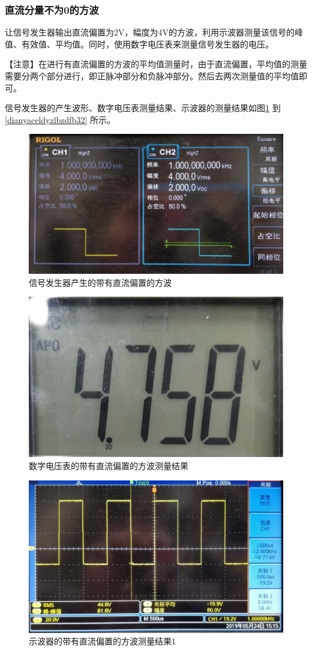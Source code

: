 \documentclass[12pt]{article}
\begin{document}
  \subsubsection{直流分量不为0的方波}
  让信号发生器输出直流偏置为2V，幅度为4V的方波，利用示波器测量该信号的峰值、有效值、平均值。同时，使用数字电压表来测量信号发生器的电压。\par
【注意】在进行有直流偏置的方波的平均值测量时，由于直流偏置，平均值的测量需要分两个部分进行，即正脉冲部分和负脉冲部分。然后去两次测量值的平均值即可。\par
信号发生器的产生波形、数字电压表测量结果、示波器的测量结果如图\ref{dianyaceldyzlbzdfb1}
到\ref{dianyaceldyzlbzdfb32}
所示。
\begin{figure}[htbp]
    \centering
    \includegraphics[width=.5\textwidth]{P001}
    \caption{信号发生器产生的带有直流偏置的方波}\label{dianyaceldyzlbzdfb1}
  \end{figure}
  \begin{figure}[htbp]
    \centering
    \includegraphics[width=.5\textwidth]{P035}
    \caption{数字电压表的带有直流偏置的方波测量结果}\label{dianyaceldyzlbzdfb2}
  \end{figure}
    \begin{figure}[htbp]
    \centering
    \includegraphics[width=.5\textwidth]{P018}
    \caption{示波器的带有直流偏置的方波测量结果1}\label{dianyaceldyzlbzdfb31}
  \end{figure}
\end{document}

